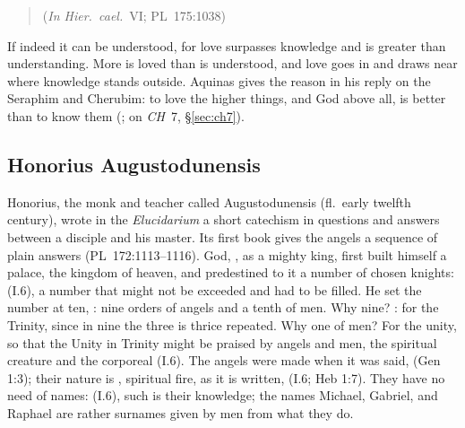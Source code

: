 \begin{quote}
 (\emph{In Hier.\ cael.}\ VI; PL~175:1038)
\end{quote}

\noindent If indeed it can be understood, for love surpasses knowledge and
is greater than understanding. More is loved than is understood, and love
goes in and draws near where knowledge stands outside. Aquinas gives the
reason in his reply on the Seraphim and Cherubim: to love the higher things,
and God above all, is better than to know them (; on \emph{CH}~7, \S\ref{sec:ch7}).

\sectionguard
\subsection{Honorius Augustodunensis}\label{sec:fa-honorius}

Honorius, the monk and teacher called Augustodunensis (fl.~early twelfth
century), wrote in the \emph{Elucidarium} a short catechism in questions and
answers between a disciple and his master. Its first book gives the
angels a sequence of plain answers (PL~172:1113--1116). God, , as a mighty king, first built himself a palace, the kingdom of heaven, and
predestined to it a number of chosen knights:  (I.6), a number that might not be
exceeded and had to be filled. He set the number at ten, : nine orders of angels and a
tenth of men. Why nine? : for the Trinity, since in nine the
three is thrice repeated. Why one of men? For the unity, so that the Unity
in Trinity might be praised by angels and men, the spiritual creature and
the corporeal (I.6). The angels were made when it was said,  (Gen 1:3); their nature is , spiritual fire, as it
is written,  (I.6; Heb 1:7).
They have no need of names:  (I.6), such is their knowledge; the names Michael,
Gabriel, and Raphael are rather surnames given by men from what they do.

